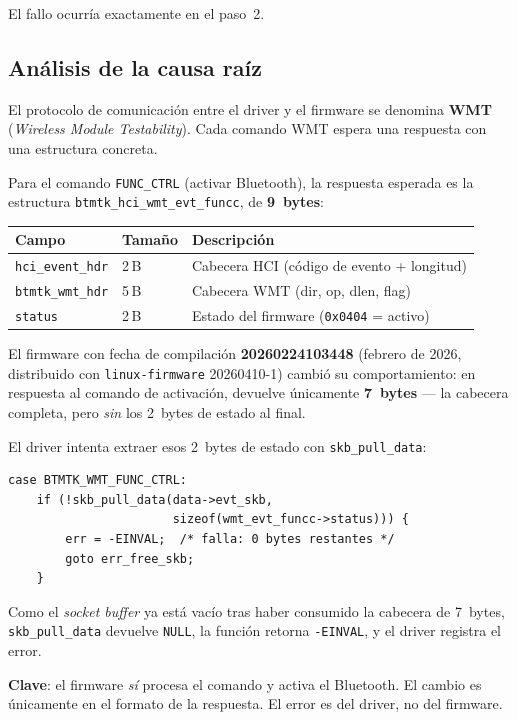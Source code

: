 \documentclass[12pt,a4paper]{article}
\begin{document}
El fallo ocurría exactamente en el paso~2.

\subsection{Análisis de la causa raíz}

El protocolo de comunicación entre el driver y el firmware se denomina
\textbf{WMT} (\emph{Wireless Module Testability}). Cada comando WMT espera
una respuesta con una estructura concreta.

Para el comando \texttt{FUNC\_CTRL} (activar Bluetooth), la respuesta
esperada es la estructura \texttt{btmtk\_hci\_wmt\_evt\_funcc}, de
\textbf{9~bytes}:

\begin{center}
\begin{tabular}{lll}
  \toprule
  Campo & Tamaño & Descripción \\
  \midrule
  \texttt{hci\_event\_hdr} & 2\,B & Cabecera HCI (código de evento + longitud) \\
  \texttt{btmtk\_wmt\_hdr} & 5\,B & Cabecera WMT (dir, op, dlen, flag) \\
  \texttt{status}          & 2\,B & Estado del firmware (\texttt{0x0404} = activo) \\
  \bottomrule
\end{tabular}
\end{center}

El firmware con fecha de compilación \textbf{20260224103448} (febrero de
2026, distribuido con \texttt{linux-firmware} 20260410-1) cambió su
comportamiento: en respuesta al comando de activación, devuelve únicamente
\textbf{7~bytes} --- la cabecera completa, pero \emph{sin} los 2~bytes de
estado al final.

El driver intenta extraer esos 2~bytes de estado con \texttt{skb\_pull\_data}:

\begin{lstlisting}[style=c]
case BTMTK_WMT_FUNC_CTRL:
    if (!skb_pull_data(data->evt_skb,
                       sizeof(wmt_evt_funcc->status))) {
        err = -EINVAL;  /* falla: 0 bytes restantes */
        goto err_free_skb;
    }
\end{lstlisting}

Como el \emph{socket buffer} ya está vacío tras haber consumido la cabecera
de 7~bytes, \texttt{skb\_pull\_data} devuelve \texttt{NULL}, la función
retorna \texttt{-EINVAL}, y el driver registra el error.

\textbf{Clave}: el firmware \emph{sí} procesa el comando y activa el
Bluetooth. El cambio es únicamente en el formato de la respuesta. El error
es del driver, no del firmware.
\end{document}
